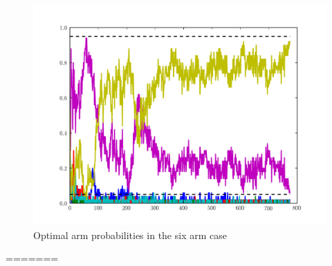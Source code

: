 \begin{figure}
\begin{center}
        \includegraphics[width=\textwidth]{./Applications/MarkDecProc/weights2.pdf}
        \caption{Optimal arm probabilities in the six arm case}
				\label{fig:weights2}
\end{center}
\end{figure}
=======
